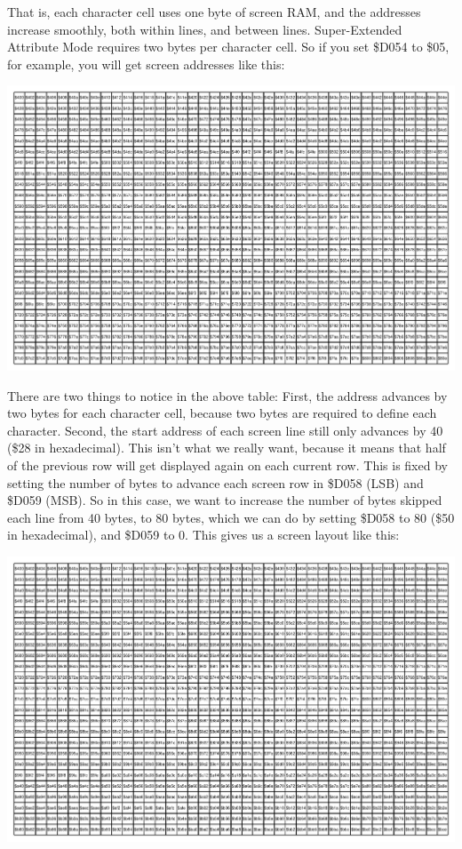 That is, each character cell uses one byte of screen RAM, and the addresses increase smoothly, both within lines, and between lines.
Super-Extended Attribute Mode requires two bytes per character cell. So if you set \$D054 to \$05, for example, you will get screen addresses like this:

\includegraphics[width=\linewidth]{images/illustrations/screen-40x25-addresses16.pdf}

There are two things to notice in the above table: First, the address advances by two bytes for each character cell, because two bytes are required to define each character.  Second, the start address of each screen line still only advances by 40 (\$28 in hexadecimal). This isn't what we really want, because it means that half of the previous row will get displayed again on each current row.  This is fixed by setting the number of bytes to advance each screen row in \$D058 (LSB) and \$D059 (MSB). So in this case, we want to increase the number of bytes skipped each line from 40 bytes, to 80 bytes, which we can do by setting \$D058 to 80 (\$50 in hexadecimal), and \$D059 to 0.  This gives us a screen layout like this:

\includegraphics[width=\linewidth]{images/illustrations/screen-40x25-addresses16-80.pdf}

